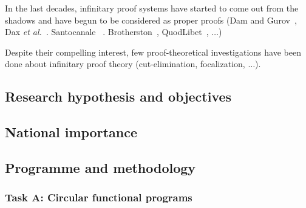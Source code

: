 In the last decades, infinitary proof systems have started to come out from the shadows and have begun to be considered as proper proofs (Dam and Gurov~\cite{DamG02},  Dax \textit{et al.}~\cite{dhl06}. Santocanale ~\cite{santoCircularProofs}. Brotherston~\cite{}, QuodLibet~\cite{AvenhausKSW03}, $\dots$)

\medskip
Despite their compelling interest,
few proof-theoretical investigations have been done about infinitary proof theory (cut-elimination, focalization, $\dots$). 




\subsection{Research hypothesis and objectives}

\subsection{National importance}

\subsection{Programme and methodology}

\subsubsection{Task A: Circular functional programs}

